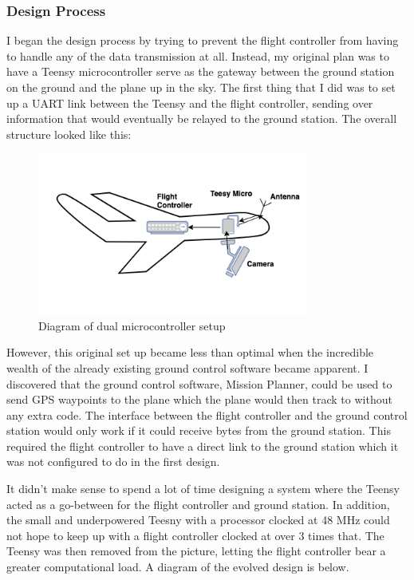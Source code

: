 \documentclass[12pt,journal,compsoc]{IEEEtran}
\begin{document}
\subsubsection{Design Process}
I began the design process by trying to prevent the flight controller from having to handle any of the data transmission at all. Instead, my original plan was to have a Teensy microcontroller serve as the gateway between the ground station on the ground and the plane up in the sky. The first thing that I did was to set up a UART link between the Teensy and the flight controller, sending over information that would eventually be relayed to the ground station. The overall structure looked like this:
\begin{figure}[h!]
\hspace*{0cm}
\centering
\includegraphics[width=3.5in]{Version1.png}
\caption{Diagram of dual microcontroller setup}
\label{version1}
\end{figure}

However, this original set up became less than optimal when the incredible wealth of the already existing ground control software became apparent. I discovered that the ground control software, Mission Planner, could be used to send GPS waypoints to the plane which the plane would then track to without any extra code. The interface between the flight controller and the ground control station would only work if it could receive bytes from the ground station. This required the flight controller to have a direct link to the ground station which it was not configured to do in the first design. 

It didn't make sense to spend a lot of time designing a system where the Teensy acted as a go-between for the flight controller and ground station. In addition, the small and underpowered Teesny with a processor clocked at 48 MHz could not hope to keep up with a flight controller clocked at over 3 times that. The Teensy was then removed from the picture, letting the flight controller bear a greater computational load. A diagram of the evolved design is below.
\end{document}
